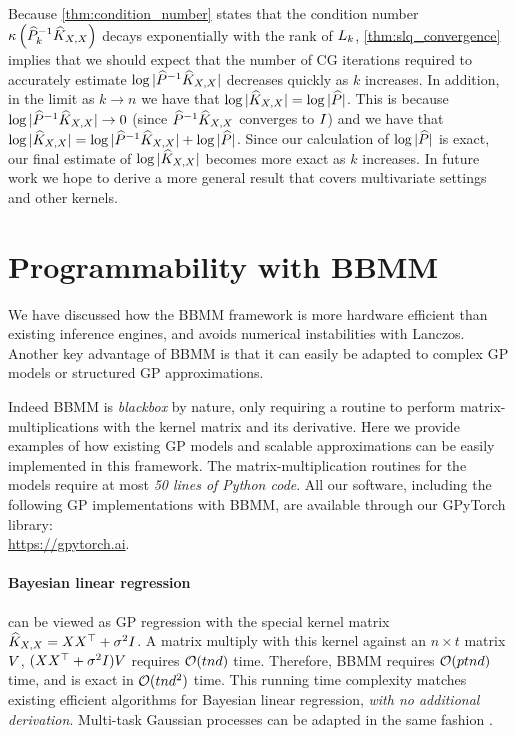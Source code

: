 Because \autoref{thm:condition_number} states that the condition number $\kappa \left( \widehat{P}_{k}^{-1}\widehat{K}_{X,X} \right)$ decays exponentially with the rank of $L_{k}$, \autoref{thm:slq_convergence} implies that we should expect that the number of CG iterations required to accurately estimate $\log \vert \widehat{P}^{-1}\widehat{K}_{X,X} \vert$ decreases quickly as $k$ increases.
In addition, in the limit as $k \rightarrow n$ we have that $\log \vert \widehat{K}_{X,X} \vert = \log \vert \widehat{P} \vert$.
This is because $\log \vert \widehat{P}^{-1}\widehat{K}_{X,X} \vert \rightarrow 0$ (since $\widehat{P}^{-1}\widehat{K}_{X,X}$ converges to $I$) and we have that $\log \vert \widehat{K}_{X,X} \vert = \log \vert \widehat{P}^{-1}\widehat{K}_{X,X} \vert + \log \vert \widehat{P} \vert$.
Since our calculation of $\log \vert \widehat{P} \vert$ is exact, our final estimate of $\log \vert \widehat{K}_{X,X} \vert$ becomes more exact as $k$ increases.
In future work we hope to derive a more general result that covers multivariate settings and other kernels.
%
\section{Programmability with BBMM}
\label{sec:advantages}
We have discussed how the BBMM framework is more hardware efficient than existing inference engines, and avoids numerical instabilities with Lanczos. Another key advantage of BBMM is that it can easily be adapted to complex GP models or structured GP approximations.

Indeed BBMM is \emph{blackbox} by nature, only requiring a routine to perform matrix-multiplications with the kernel matrix and its derivative.
Here we provide examples of how existing GP models and scalable approximations can be easily implemented in this framework.
The matrix-multiplication routines for the models require at most \emph{50 lines of Python code}.
All our software, including the following GP implementations with BBMM, are available through our GPyTorch library: \\
\url{https://gpytorch.ai}.
%

\paragraph{Bayesian linear regression} can be viewed as GP regression with the special kernel matrix $\widehat{K}_{X,X} = XX^{\top} + \sigma^{2}I$.
A matrix multiply with this kernel against an $n \times t$ matrix $V$, $(XX^{\top} + \sigma^{2}I)V$ requires $\bigo{tnd}$ time.
Therefore, BBMM requires $\bigo{ptnd}$ time, and is exact in $\bigo{tnd^2}$ time.
This running time complexity matches existing efficient algorithms for Bayesian linear regression, \emph{with no additional derivation}.
Multi-task Gaussian processes \cite{bonilla2008multi} can be adapted in the same fashion \cite{gardner2018product}.

